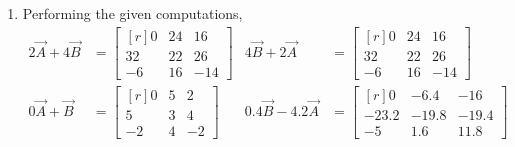 \begin{enumerate}
    \item Performing the given computations,
          \begin{align}
              2\vec{A} + 4\vec{B}     & = \begin{bmatrix*}[r]
                                              0  & 24 & 16  \\
                                              32 & 22 & 26  \\
                                              -6 & 16 & -14
                                          \end{bmatrix*}    &
              4\Vec{B} + 2\vec{A}     & = \begin{bmatrix*}[r]
                                              0  & 24 & 16  \\
                                              32 & 22 & 26  \\
                                              -6 & 16 & -14
                                          \end{bmatrix*}    \\
              0\vec{A} + \vec{B}      & = \begin{bmatrix*}[r]
                                              0  & 5 & 2  \\
                                              5  & 3 & 4  \\
                                              -2 & 4 & -2
                                          \end{bmatrix*}    &
              0.4\vec{B} - 4.2\vec{A} & = \begin{bmatrix*}[r]
                                              0     & - 6.4 & -16   \\
                                              -23.2 & -19.8 & -19.4 \\
                                              -5    & 1.6   & 11.8
                                          \end{bmatrix*}
          \end{align}


\end{enumerate}
